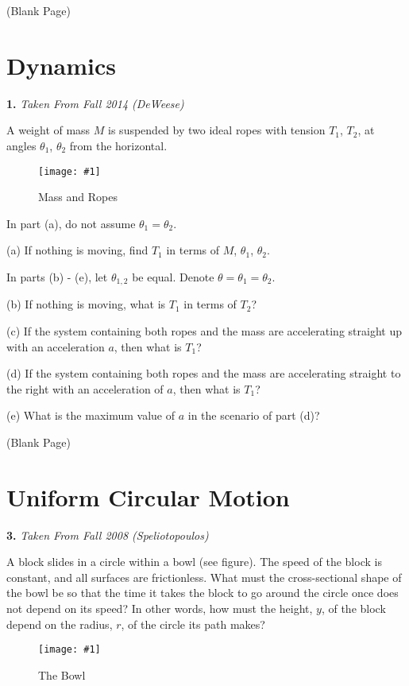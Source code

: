 \documentclass[11pt]{article}
\newcommand{\fig}[4]{
    \begin{figure}[H]
        \centering
        \texttt{[image: \#1]}
        \caption{#2}
        \label{exp4fit}
    \end{figure}
}
\theoremstyle{gangnamstyle}{\newtheorem{definition}{Definition}[]}
\theoremstyle{gangnamstyle}{\newtheorem{example}{Example}[]}
\theoremstyle{gangnamstyle}{\newtheorem{problem}{Problem}[]}
\begin{document}
\begin{center}
(Blank Page)
\end{center}

\pagebreak

\section{Dynamics}

\textbf{1.} \textit{Taken From Fall 2014 (DeWeese)} 

A weight of mass $M$ is suspended by two ideal ropes with tension $T_1$, $T_2$, at angles $\theta_1$, $\theta_2$ from the horizontal. 

\fig{figs/0708/block.jpeg}{Mass and Ropes}{0.125}{0} 

In part (a), do not assume $\theta_1 = \theta_2$. 

(a) If nothing is moving, find $T_1$ in terms of $M$, $\theta_1$, $\theta_2$. 

In parts (b) - (e), let $\theta_{1, 2}$ be equal. Denote $\theta = \theta_1 = \theta_2$. 

(b) If nothing is moving, what is $T_1$ in terms of $T_2$? 

(c) If the system containing both ropes and the mass are accelerating straight up with an acceleration $a$, then what is $T_1$? 

(d) If the system containing both ropes and the mass are accelerating straight to the right with an acceleration of $a$, then what is $T_1$? 

(e) What is the maximum value of $a$ in the scenario of part (d)? 

\pagebreak

\begin{center}
(Blank Page)
\end{center}

\pagebreak

\section{Uniform Circular Motion}

\textbf{3.} \textit{Taken From Fall 2008 (Speliotopoulos)} 

A block slides in a circle within a bowl (see figure). The speed of the block is constant, and all surfaces are frictionless. What must the cross-sectional shape of the bowl be so that the time it takes the block to go around the circle once does not depend on its speed? In other words, how must the height, $y$, of the block depend on the radius, $r$, of the circle its path makes?
\fig{figs/0708/bowl.png}{The Bowl}{0.4}{0} 
\end{document}
